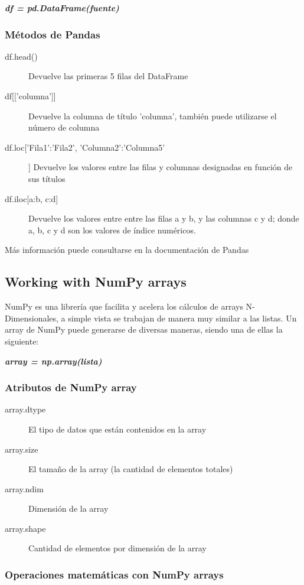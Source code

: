 \documentclass[10pt,a4paper]{article}
\begin{document}
\textbf{\emph{df = pd.DataFrame(fuente)}}
\subsubsection{Métodos de Pandas}
\begin{description}
\item [df.head()] Devuelve las primeras 5 filas del DataFrame
\item [{df[['columna']]}]  Devuelve la columna de título 'columna', también puede utilizarse el número de columna
\item [df.loc['Fila1':'Fila2', 'Columna2':'Columna5']] Devuelve los valores entre las filas y columnas designadas en función de sus títulos
\item [{df.iloc[a:b, c:d]}] Devuelve los valores entre entre las filas a y b, y las columnas c y d; donde a, b, c y d son los valores de índice numéricos.
\end{description}
Más información puede consultarse en la documentación de Pandas \cite{pandasDoc}
\subsection{Working with NumPy arrays}
NumPy es una librería que facilita y acelera los cálculos de arrays N-Dimensionales, a simple vista se trabajan de manera muy similar a las listas. Un array de NumPy puede generarse de diversas maneras, siendo una de ellas la siguiente:

\textbf{\emph{array = np.array(lista)}}

\subsubsection{Atributos de NumPy array}
\begin{description}
\item [array.dtype] El tipo de datos que están contenidos en la array
\item [array.size] El tamaño de la array (la cantidad de elementos totales)
\item [array.ndim] Dimensión de la array
\item [array.shape] Cantidad de elementos por dimensión de la array
\end{description}

\subsubsection{Operaciones matemáticas con NumPy arrays}
\end{document}
